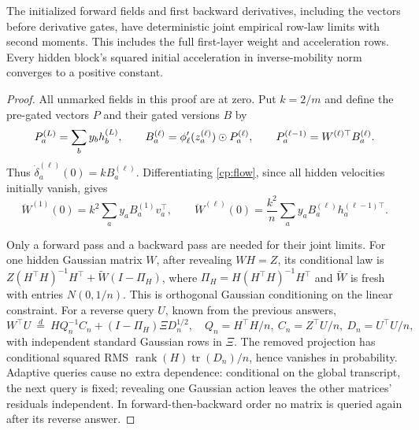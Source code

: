 \begin{lemma}
\label{fl:initial-activity}
The initialized forward fields and first backward derivatives, including
the vectors before derivative gates, have deterministic joint empirical
row-law limits with second moments. This includes the full first-layer
weight and acceleration rows. Every hidden block's squared initial
acceleration in inverse-mobility norm converges to a positive constant.
\end{lemma}
\begin{proof}
All unmarked fields in this proof are at zero. Put $k=2/m$ and define
the pre-gated vectors $P$ and their gated versions $B$ by
\[
 P_a^{(L)}=\sum_b y_bh_b^{(L)},\qquad
 B_a^{(\ell)}=\phi_\ell'(z_a^{(\ell)})\mathbin{\odot} P_a^{(\ell)},\qquad
 P_a^{(\ell-1)}=W^{(\ell)\top}B_a^{(\ell)}.
\]
Thus $\dot\delta_a^{(\ell)}(0)=kB_a^{(\ell)}$. Differentiating
\eqref{cp:flow}, since all hidden velocities initially vanish, gives
\begin{equation}
 \ddot W^{(1)}(0)=k^2\sum_a y_aB_a^{(1)}v_a^\top,\qquad
 \ddot W^{(\ell)}(0)=\frac{k^2}{n}\sum_a y_aB_a^{(\ell)}h_a^{(\ell-1)\top}.
 \label{fl:initial-forces}
\end{equation}

Only a forward pass and a backward pass are needed for their joint limits.
For one hidden Gaussian matrix $W$, after revealing $WH=Z$, its conditional
law is $Z(H^\top H)^{-1}H^\top+\widetilde W(I-\Pi_H)$, where
$\Pi_H=H(H^\top H)^{-1}H^\top$ and $\widetilde W$ is fresh with
entries $N(0,1/n)$. This is orthogonal Gaussian conditioning on the
linear constraint. For a reverse query $U$, known from the previous answers,
\begin{equation}
 W^\top U\ \overset d=\ H Q_n^{-1}C_n+(I-\Pi_H)\Xi D_n^{1/2},
 \quad Q_n=H^\top H/n,\ C_n=Z^\top U/n,\ D_n=U^\top U/n,
 \label{fl:reverse-conditioning}
\end{equation}
with independent standard Gaussian rows in $\Xi$. The removed projection
has conditional squared RMS
$\operatorname{rank}(H)\operatorname{tr}(D_n)/n$, hence vanishes in
probability. Adaptive queries cause no extra dependence: conditional on the
global transcript, the next query is fixed; revealing one Gaussian action
leaves the other matrices' residuals independent. In forward-then-backward
order no matrix is queried again after its reverse answer.


\end{proof}

